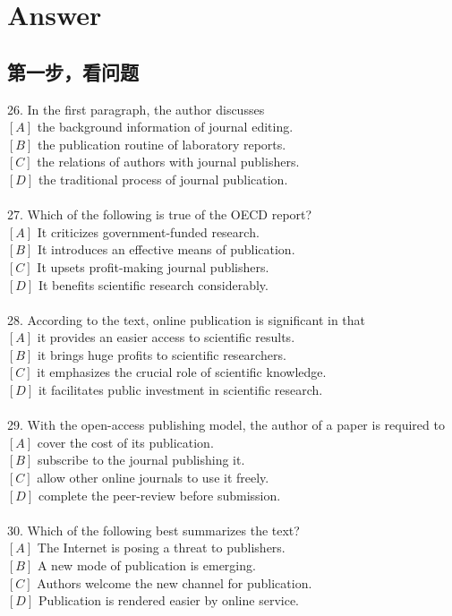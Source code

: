 \documentclass[a4paper]{ctexart}
\begin{document}
\section{Answer}
\subsection{第一步，看问题}

26.	In the first paragraph, the author discusses\\
$[A]$ the background information of journal editing.\\
$[B]$ the publication routine of laboratory reports.\\
$[C]$ the relations of authors with journal publishers.\\
$[D]$ the traditional process of journal publication.\\
\\
27.	Which of the following is true of the OECD report?\\
$[A]$ It criticizes government-funded research.\\
$[B]$ It introduces an effective means of publication.\\
$[C]$ It upsets profit-making journal publishers.\\
$[D]$ It benefits scientific research considerably.\\
\\
28.	According to the text, online publication is significant in that\\
$[A]$ it provides an easier access to scientific results.\\
$[B]$ it brings huge profits to scientific researchers.\\
$[C]$ it emphasizes the crucial role of scientific knowledge.\\
$[D]$ it facilitates public investment in scientific research.\\
\\
29.	With the open-access publishing model, the author of a paper is required to\\
$[A]$ cover the cost of its publication.\\
$[B]$ subscribe to the journal publishing it.\\
$[C]$ allow other online journals to use it freely.\\
$[D]$ complete the peer-review before submission.\\
\\
30.	Which of the following best summarizes the text?\\
$[A]$ The Internet is posing a threat to publishers.\\
$[B]$ A new mode of publication is emerging.\\
$[C]$ Authors welcome the new channel for publication.\\
$[D]$ Publication is rendered easier by online service.\\
\end{document}
